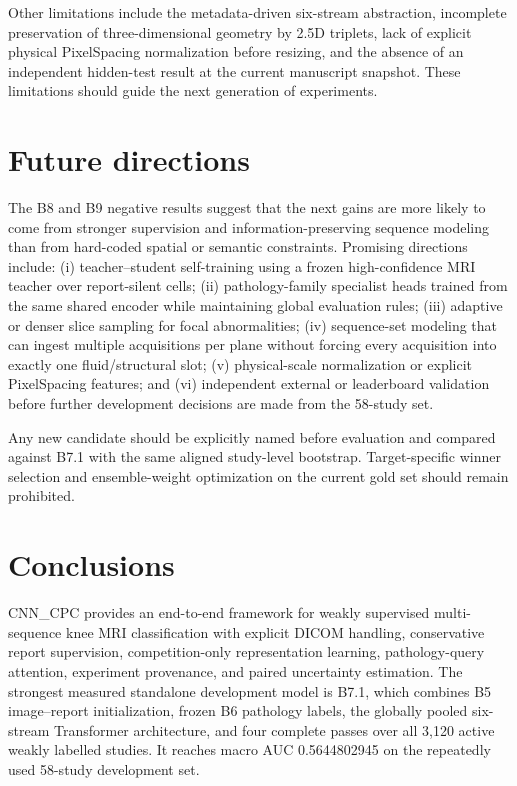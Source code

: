 \documentclass[preprint,12pt]{elsarticle}
\begin{document}
Other limitations include the metadata-driven six-stream abstraction, incomplete preservation of three-dimensional geometry by 2.5D triplets, lack of explicit physical PixelSpacing normalization before resizing, and the absence of an independent hidden-test result at the current manuscript snapshot. These limitations should guide the next generation of experiments.

\section{Future directions}
\label{sec:future}

The B8 and B9 negative results suggest that the next gains are more likely to come from stronger supervision and information-preserving sequence modeling than from hard-coded spatial or semantic constraints. Promising directions include: (i) teacher--student self-training using a frozen high-confidence MRI teacher over report-silent cells; (ii) pathology-family specialist heads trained from the same shared encoder while maintaining global evaluation rules; (iii) adaptive or denser slice sampling for focal abnormalities; (iv) sequence-set modeling that can ingest multiple acquisitions per plane without forcing every acquisition into exactly one fluid/structural slot; (v) physical-scale normalization or explicit PixelSpacing features; and (vi) independent external or leaderboard validation before further development decisions are made from the 58-study set.

Any new candidate should be explicitly named before evaluation and compared against B7.1 with the same aligned study-level bootstrap. Target-specific winner selection and ensemble-weight optimization on the current gold set should remain prohibited.

\section{Conclusions}
\label{sec:conclusion}

CNN\_CPC provides an end-to-end framework for weakly supervised multi-sequence knee MRI classification with explicit DICOM handling, conservative report supervision, competition-only representation learning, pathology-query attention, experiment provenance, and paired uncertainty estimation. The strongest measured standalone development model is B7.1, which combines B5 image--report initialization, frozen B6 pathology labels, the globally pooled six-stream Transformer architecture, and four complete passes over all 3,120 active weakly labelled studies. It reaches macro AUC 0.5644802945 on the repeatedly used 58-study development set.
\end{document}
